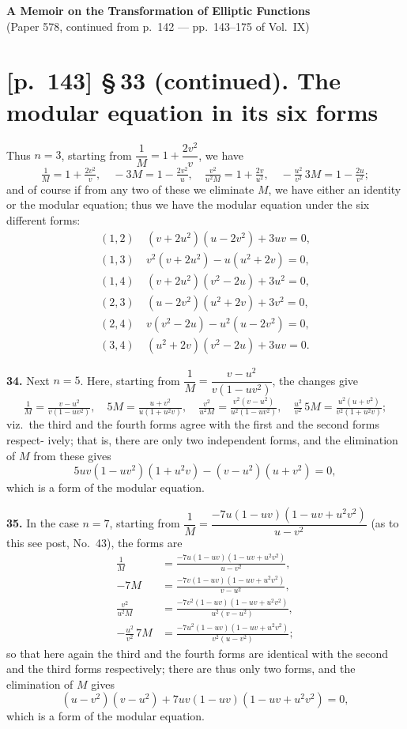 \documentclass[11pt]{article}
\begin{document}
\begin{center}
{\Large\bfseries A Memoir on the Transformation of Elliptic Functions}\\[2pt]
{\small (Paper 578, continued from p.~142 --- pp.~143--175 of Vol.~IX)}
\end{center}

\section*{[p.~143] \S\,33 (continued). The modular equation in its six forms}

Thus $n=3$, starting from $\dfrac{1}{M}=1+\dfrac{2v^2}{v}$, we have
\[
\tfrac{1}{M}=1+\tfrac{2v^2}{v},\quad -3M=1-\tfrac{2v^2}{u},\quad \tfrac{v^2}{u^2 M}=1+\tfrac{2v}{u^2},\quad -\tfrac{u^2}{v^2}\,3M=1-\tfrac{2u}{v^2};
\]
and of course if from any two of these we eliminate $M$, we have either an identity
or the modular equation; thus we have the modular equation under the six different
forms:
\[
\begin{aligned}
(1,2)\ &(v+2u^2)(u-2v^2)+3uv=0,\\
(1,3)\ &v^2(v+2u^2)-u(u^2+2v)=0,\\
(1,4)\ &(v+2u^2)(v^2-2u)+3u^2=0,\\
(2,3)\ &(u-2v^2)(u^2+2v)+3v^2=0,\\
(2,4)\ &v(v^2-2u)-u^2(u-2v^2)=0,\\
(3,4)\ &(u^2+2v)(v^2-2u)+3uv=0.
\end{aligned}
\]

\medskip
\noindent\textbf{34.} Next $n=5$. Here, starting from $\dfrac{1}{M}=\dfrac{v-u^2}{v(1-uv^2)}$, the changes give
\[
\tfrac{1}{M}=\tfrac{v-u^2}{v(1-uv^2)},\quad 5M=\tfrac{u+v^2}{u(1+u^2v)},\quad \tfrac{v^2}{u^2 M}=\tfrac{v^2(v-u^2)}{u^2(1-uv^2)},\quad \tfrac{u^2}{v^2}\,5M=\tfrac{u^2(u+v^2)}{v^2(1+u^2v)};
\]
viz.\ the third and the fourth forms agree with the first and the second forms respect-
ively; that is, there are only two independent forms, and the elimination of $M$ from
these gives
\[
5uv(1-uv^2)(1+u^2v)-(v-u^2)(u+v^2)=0,
\]
which is a form of the modular equation.

\medskip
\noindent\textbf{35.} In the case $n=7$, starting from $\dfrac{1}{M}=\dfrac{-7u(1-uv)(1-uv+u^2v^2)}{u-v^2}$ (as to this see
post, No.~43), the forms are
\begin{align*}
\tfrac{1}{M}&=\tfrac{-7u(1-uv)(1-uv+u^2v^2)}{u-v^2}\tag{1},\\
-7M&=\tfrac{-7v(1-uv)(1-uv+u^2v^2)}{v-u^2}\tag{2},\\
\tfrac{v^2}{u^2 M}&=\tfrac{-7v^2(1-uv)(1-uv+u^2v^2)}{u^2(v-u^2)}\tag{3},\\
-\tfrac{u^2}{v^2}\,7M&=\tfrac{-7u^2(1-uv)(1-uv+u^2v^2)}{v^2(u-v^2)}\tag{4};
\end{align*}
so that here again the third and the fourth forms are identical with the second and the
third forms respectively; there are thus only two forms, and the elimination of $M$ gives
\[
(u-v^2)(v-u^2)+7uv(1-uv)(1-uv+u^2v^2)=0,
\]
which is a form of the modular equation.
\end{document}
